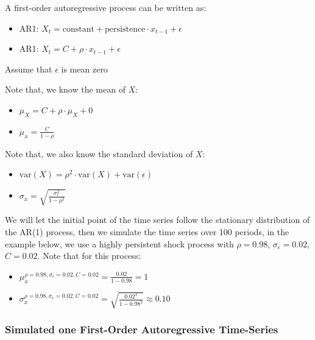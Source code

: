 \documentclass[
]{book}
\begin{document}
A first-order autoregressive process can be written as:

\begin{itemize}
\item
  AR1:
  \(X_t =\textrm{constant}+\textrm{persistence}\cdot x_{t-1} +\epsilon\)
\item
  AR1: \(X_t =C+\rho \cdot x_{t-1} +\epsilon\)
\end{itemize}

Assume that \(\epsilon\) is mean zero

Note that, we know the mean of \(X\):

\begin{itemize}
\item
  \(\displaystyle \mu_X =C+\rho \cdot \mu_X +0\)
\item
  \(\displaystyle \mu_x =\frac{C}{1-\rho }\)
\end{itemize}

Note that, we also know the standard deviation of \(X\):

\begin{itemize}
\item
  \(\displaystyle \textrm{var}\left(X\right)=\rho^2 \cdot \textrm{var}\left(X\right)+\textrm{var}\left(\epsilon \right)\)
\item
  \(\displaystyle \sigma_x =\sqrt{\frac{\sigma_{\epsilon }^2 }{1-\rho^2 }}\)
\end{itemize}

We will let the initial point of the time series follow the stationary
distribution of the AR(1) process, then we simulate the time series over
100 periods, in the example below, we use a highly persistent shock
process with \(\rho =0.98\), \(\sigma_{\epsilon } =0.02\), \(C=0.02\). Note
that for this process:

\begin{itemize}
\item
  \(\displaystyle \mu_x^{\rho =0.98,\sigma_{\epsilon } =0.02,C=0.02} =\frac{0.02}{1-0.98}=1\)
\item
  \(\displaystyle \sigma_x^{\rho =0.98,\sigma_{\epsilon } =0.02,C=0.02} =\sqrt{\frac{0.02^2 }{1-0.98^2 }}\approx 0.10\)
\end{itemize}

\hypertarget{simulated-one-first-order-autoregressive-time-series}{%
\subsubsection{Simulated one First-Order Autoregressive Time-Series}\label{simulated-one-first-order-autoregressive-time-series}}
\end{document}
